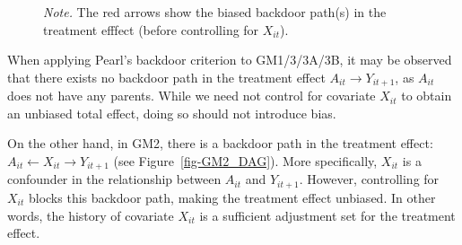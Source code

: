 \documentclass[
  12pt,
  a4paper,
]{article}
\begin{document}
\begin{figure}[H]
\begin{minipage}{0.50\linewidth}
{}

\end{minipage}%
\newline
\begin{minipage}{0.50\linewidth}



\end{minipage}%
%
\begin{minipage}{0.50\linewidth}
\emph{Note.} The red arrows show the biased backdoor path(s) in the
treatment efffect (before controlling for \(X_{it}\)).\end{minipage}%

\end{figure}%

When applying Pearl's backdoor criterion to GM1/3/3A/3B, it may be
observed that there exists no backdoor path in the treatment effect
\(A_{it} \to Y_{it+1}\), as \(A_{it}\) does not have any parents. While
we need not control for covariate \(X_{it}\) to obtain an unbiased total
effect, doing so should not introduce bias.

On the other hand, in GM2, there is a backdoor path in the treatment
effect: \(A_{it} \leftarrow X_{it} \rightarrow Y_{it+1}\) (see
Figure~\ref{fig-GM2_DAG}). More specifically, \(X_{it}\) is a confounder
in the relationship between \(A_{it}\) and \(Y_{it+1}\). However,
controlling for \(X_{it}\) blocks this backdoor path, making the
treatment effect unbiased. In other words, the history of covariate
\(X_{it}\) is a sufficient adjustment set for the treatment effect.
\end{document}
